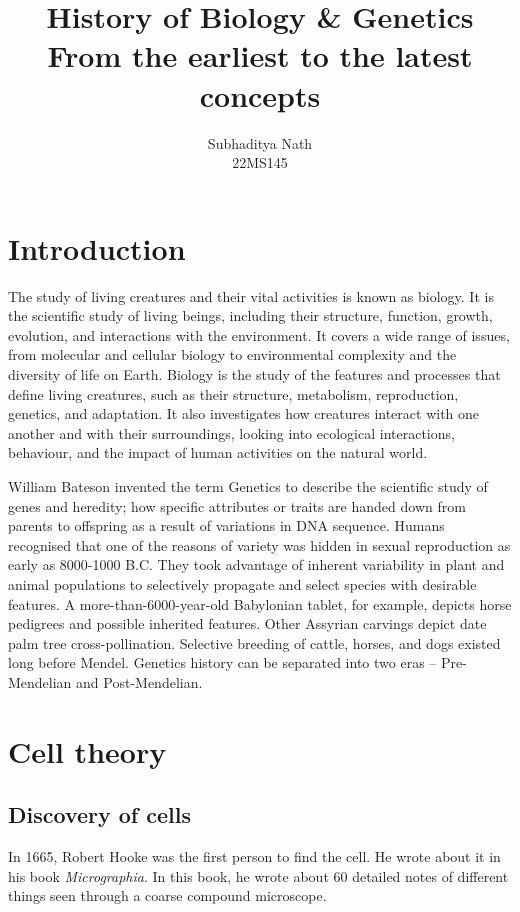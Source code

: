 \documentclass[12pt, a4paper, titlepage]{article}
\title{
    History of Biology \& Genetics \\
    \small From the earliest to the latest concepts
}
\author{Subhaditya Nath \\ 22MS145}
\date{\vskip 1em
    Spring 2023 \\
    \small LS1201
}
\begin{document}
\maketitle

\renewcommand*\contentsname{Summary}
\tableofcontents
\newpage
{}


\section{Introduction}
The study of living creatures and their vital activities is known as biology. It is the scientific study of living beings, including their structure, function, growth, evolution, and interactions with the environment. It covers a wide range of issues, from molecular and cellular biology to environmental complexity and the diversity of life on Earth. Biology is the study of the features and processes that define living creatures, such as their structure, metabolism, reproduction, genetics, and adaptation. It also investigates how creatures interact with one another and with their surroundings, looking into ecological interactions, behaviour, and the impact of human activities on the natural world.

William Bateson invented the term Genetics to describe the scientific study of genes and heredity; how specific attributes or traits are handed down from parents to offspring as a result of variations in DNA sequence. Humans recognised that one of the reasons of variety was hidden in sexual reproduction as early as 8000-1000 B.C. They took advantage of inherent variability in plant and animal populations to selectively propagate and select species with desirable features. A more-than-6000-year-old Babylonian tablet, for example, depicts horse pedigrees and possible inherited features. Other Assyrian carvings depict date palm tree cross-pollination. Selective breeding of cattle, horses, and dogs existed long before Mendel. Genetics history can be separated into two eras --  Pre-Mendelian and Post-Mendelian.


\section{Cell theory}
\subsection{Discovery of cells}
In 1665, Robert Hooke was the first person to find the cell. He wrote about it in his book \textit{Micrographia}. In this book, he wrote about 60 detailed notes of different things seen through a coarse compound microscope.
\end{document}
